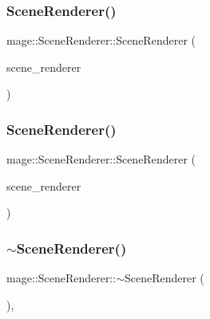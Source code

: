 \subsubsection{\texorpdfstring{Scene\+Renderer()}{SceneRenderer()}\hspace{0.1cm}{\footnotesize\ttfamily [2/3]}}
{\footnotesize\ttfamily mage\+::\+Scene\+Renderer\+::\+Scene\+Renderer (\begin{DoxyParamCaption}\item[{const \hyperlink{classmage_1_1_scene_renderer}{Scene\+Renderer} \&}]{scene\+\_\+renderer }\end{DoxyParamCaption})\hspace{0.3cm}{\ttfamily [delete]}}

\hypertarget{classmage_1_1_scene_renderer_ab9846f0a77e2bc5e9eeb00aed67424eb}{}\label{classmage_1_1_scene_renderer_ab9846f0a77e2bc5e9eeb00aed67424eb} 
\subsubsection{\texorpdfstring{Scene\+Renderer()}{SceneRenderer()}\hspace{0.1cm}{\footnotesize\ttfamily [3/3]}}
{\footnotesize\ttfamily mage\+::\+Scene\+Renderer\+::\+Scene\+Renderer (\begin{DoxyParamCaption}\item[{\hyperlink{classmage_1_1_scene_renderer}{Scene\+Renderer} \&\&}]{scene\+\_\+renderer }\end{DoxyParamCaption})\hspace{0.3cm}{\ttfamily [default]}}

\hypertarget{classmage_1_1_scene_renderer_a546f45fc7542fa1677d3e9c2014f108e}{}\label{classmage_1_1_scene_renderer_a546f45fc7542fa1677d3e9c2014f108e} 
\subsubsection{\texorpdfstring{$\sim$\+Scene\+Renderer()}{~SceneRenderer()}}
{\footnotesize\ttfamily mage\+::\+Scene\+Renderer\+::$\sim$\+Scene\+Renderer (\begin{DoxyParamCaption}{ }\end{DoxyParamCaption})\hspace{0.3cm}{\ttfamily [virtual]}, {\ttfamily [default]}}




